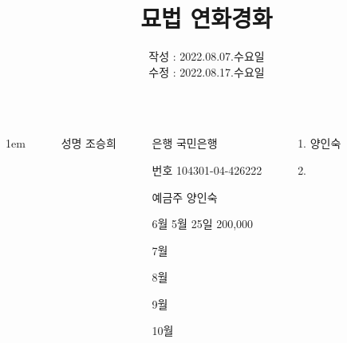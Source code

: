 \documentclass[25pt, a1paper ]{tikzposter}
\title{묘법 연화경화 }
\author{ 	작성 : 2022.08.07.수요일 \\
				수정 : 2022.08.17.수요일 }
\begin{document}
	\maketitle

	\begin{columns}
			{
					\setlength{\leftmargini}{7em}
					\setlength{\labelsep} {1em}
				\begin{LARGE}
					\begin{itemize}
					\item [성명] 조승희
					\end{itemize}
				\end{LARGE}
			}


		{
			\setlength{\leftmargini}{7em}			
			\setlength{\labelsep}{1em} %

			\begin{LARGE}
			\begin{itemize}
			\item [은행] 국민은행
			\item [번호] 104301-04-426222
			\item [예금주] 양인숙

			\item [6월] 5월 25일 200,000
			\item [7월] 
			\item [8월] 
			\item [9월] 
			\item [10월] 
			\end{itemize}
			\end{LARGE}

		}


		{
			\setlength{\leftmargini}{7em}			
			\setlength{\labelsep}{1em} %
			\begin{LARGE}
			\begin{itemize}
			\item [1.] 	양인숙
			\item [2.] 	
			\end{itemize}
			\end{LARGE}

}
\end{columns}
\end{document}
